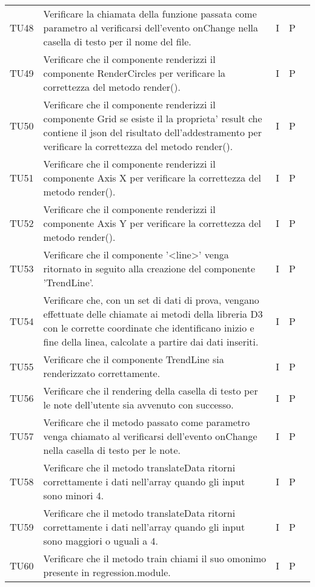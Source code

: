 \begin{longtable} {
		>{}p{15mm} 
		>{}p{79.5mm}
		>{}p{15mm} 
		>{}p{15mm}
		>{}p{0mm}}
	TU48    	& Verificare la chiamata della funzione passata come parametro al verificarsi dell'evento onChange nella casella di testo per il nome del file. & I & P &\TBstrut \\ [2mm]
	TU49		& Verificare che il componente renderizzi il componente RenderCircles per verificare la correttezza del metodo render().& I & P &\TBstrut \\ [2mm]
	TU50		& Verificare che il componente renderizzi il componente Grid se esiste il la proprieta' result che contiene il json del risultato dell'addestramento per verificare la correttezza del metodo render().& I & P &\TBstrut \\ [2mm]
	TU51		& Verificare che il componente renderizzi il componente Axis X per verificare la correttezza del metodo render().& I & P &\TBstrut \\ [2mm]
	TU52		& Verificare che il componente renderizzi il componente Axis Y per verificare la correttezza del metodo render().& I & P &\TBstrut \\ [2mm]
	TU53	    & Verificare che il componente '<line>' venga ritornato in seguito alla creazione del componente 'TrendLine'. & I & P &\TBstrut \\ [2mm]
	TU54    	& Verificare che, con un set di dati di prova, vengano effettuate delle chiamate ai metodi della libreria D3 con le corrette coordinate che identificano inizio e fine della linea, calcolate a partire dai dati inseriti. & I & P &\TBstrut \\ [2mm]
    TU55		& Verificare che il componente TrendLine sia renderizzato correttamente. & I & P &\TBstrut \\ [2mm]
	TU56    	& Verificare che il rendering della casella di testo per le note dell'utente sia avvenuto con successo. & I & P &\TBstrut \\ [2mm]
	TU57    	& Verificare che il metodo passato come parametro venga chiamato al verificarsi dell'evento onChange nella casella di testo per le note. & I & P &\TBstrut \\ [2mm]
	TU58		& Verificare che il metodo translateData ritorni correttamente i dati nell'array quando gli input sono minori 4.& I & P &\TBstrut \\ [2mm]
	TU59		& Verificare che il metodo translateData ritorni correttamente i dati nell'array quando gli input sono maggiori o uguali a 4.& I & P &\TBstrut \\ [2mm]
	TU60		& Verificare che il metodo train chiami il suo omonimo presente in regression.module. & I & P &\TBstrut \\ [2mm]

\end{longtable}
